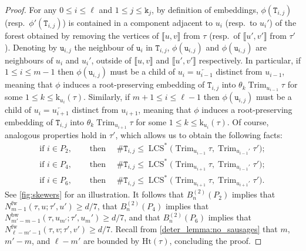 \documentclass[11pt,reqno]{amsart}
\newcommand{\1}{\mathbf{1}}
\newcommand{\0}{\mathbf{0}}
\newcommand{\ttT}{\mathtt{T}}
\newcommand{\ttk}{\mathtt{k}}
\newcommand{\ttu}{\mathtt{u}}
\newcommand{\Ht}{\mathrm{Ht}}
\newcommand{\rk}{\mathrm{k}}
\newcommand{\Trim}{\operatorname{Trim}}
\newcommand{\LCS}{\operatorname{LCS}}
\newcommand{\fw}{\mathrm{fw}}
\newcommand{\bw}{\mathrm{bw}}
\begin{document}
\begin{proof}
For any $0\leq i\leq \ell$ and $1\leq j\leq \ttk_j$, by definition of embeddings, $\phi(\ttT_{i,j})$ (resp.~$\phi'(\ttT_{i,j})$) is contained in a component adjacent to $u_i$ (resp.~to $u_i'$) of the forest obtained by removing the vertices of $\llbracket u,v\rrbracket$ from $\tau$ (resp.~of $\llbracket u',v'\rrbracket$ from $\tau'$). Denoting by $\ttu_{i,j}$ the neighbour of $\ttu_i$ in $\ttT_{i,j}$, $\phi(\ttu_{i,j})$ and $\phi(\ttu_{i,j})$ are neighbours of $u_i$ and $u_i'$, outside of $\llbracket u,v\rrbracket$ and $\llbracket u',v'\rrbracket$ respectively. In particular, if $1\leq i\leq m-1$ then $\phi(\ttu_{i,j})$ must be a child of $u_i=\overleftarrow{u_{i-1}}$ distinct from $u_{i-1}$, meaning that $\phi$ induces a root-preserving embedding of $\ttT_{i,j}$ into $\theta_{k}\Trim_{u_{i-1}}\tau$ for some $1\leq k\leq \rk_{u_i}(\tau)$. Similarly, if $m+1\leq i\leq \ell-1$ then $\phi(\ttu_{i,j})$ must be a child of $u_i=\overleftarrow{u_{i+1}}$ distinct from $u_{i+1}$, meaning that $\phi$ induces a root-preserving embedding of $\ttT_{i,j}$ into $\theta_{k}\Trim_{u_{i+1}}\tau$ for some $1\leq k\leq \rk_{u_i}(\tau)$. Of course, analogous properties hold in $\tau'$, which allows us to obtain the following facts:
\begin{align*}
    \text{if }i\in P_2,\quad &\text{ then }\quad \#\ttT_{i,j}\leq \LCS^*\big(\Trim_{u_{i-1}}\tau,\Trim_{u_{i-1}'}\tau'\big);\\
    \text{if }i\in P_4,\quad &\text{ then }\quad \#\ttT_{i,j}\leq \LCS^*\big(\Trim_{u_{i+1}}\tau,\Trim_{u_{i-1}'}\tau'\big);\\
    \text{if }i\in P_6,\quad &\text{ then }\quad \#\ttT_{i,j}\leq \LCS^*\big(\Trim_{u_{i+1}}\tau,\Trim_{u_{i+1}'}\tau'\big).    
\end{align*}
See \cref{fig:skewers} for an illustration. It follows that $B_n^{(2)}(P_2)$ implies that $N_{m-1}^{\fw}(\tau,u;\tau',u')\geq d/7$, that $B_n^{(2)}(P_4)$ implies that $N_{m'-m-1}^{\bw}(\tau,u_{m'};\tau',u_{m}')\geq d/7$, and that $B_n^{(2)}(P_6)$ implies that $N_{\ell-m'-1}^{\fw}(\tau,v;\tau',v')\geq d/7$. Recall from \cref{deter_lemma:no_sausages} that $m$, $m'-m$, and $\ell-m'$ are bounded by $\Ht(\tau)$, concluding the proof.
\end{proof}
\end{document}
